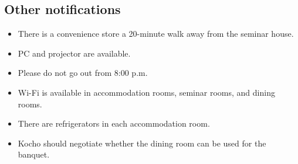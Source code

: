 \documentclass[unicode,a4paper,11pt]{ltjsarticle}
\begin{document}
\subsection*{Other notifications}

\begin{itemize}
      \item
            There is a convenience store a 20-minute walk away from the seminar house.
      \item
            PC and projector are available.
      \item
            Please do not go out from 8:00 p.m.
      \item
            Wi-Fi is available in accommodation rooms, seminar rooms, and dining rooms.
      \item
            There are refrigerators in each accommodation room.
      \item
            Kocho should negotiate whether the dining room can be used for the banquet.
\end{itemize}
\end{document}

